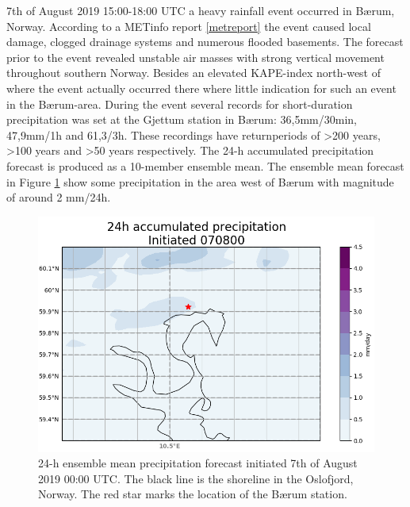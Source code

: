 7th of August 2019 15:00-18:00 UTC a heavy rainfall event occurred in Bærum, Norway. According to a METinfo report \ref{metreport} the event caused local damage, clogged drainage systems and numerous flooded basements. The forecast prior to the event revealed unstable air masses with strong vertical movement throughout southern Norway. Besides an elevated KAPE-index north-west of where the event actually occurred there where little indication for such an event in the Bærum-area. During the event several records for short-duration precipitation was set at the Gjettum station in Bærum: 36,5mm/30min, 47,9mm/1h and 61,3/3h. These recordings have returnperiods of >200 years, >100 years and >50 years respectively. The 24-h accumulated precipitation forecast is produced as a 10-member ensemble mean. The ensemble mean forecast in Figure \ref{fig:ens_mean} show some precipitation in the area west of Bærum with magnitude of around 2 mm/24h.  

\begin{figure}[hbt!]
    \centering
    \includegraphics[scale=0.4]{figures/ens_mean.PNG}
    \caption{24-h ensemble mean precipitation forecast initiated 7th of August 2019 00:00 UTC. The black line is the shoreline in the Oslofjord, Norway. The red star marks the location of the Bærum station.}
    \label{fig:ens_mean}
\end{figure}

